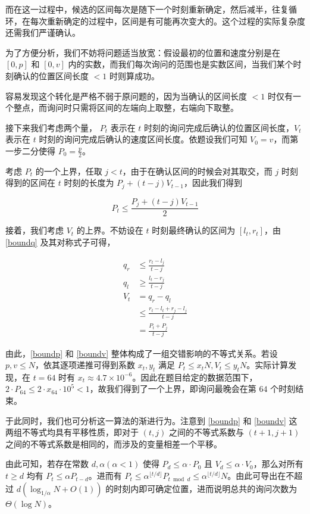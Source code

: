 \documentclass[12pt]{ctexart}
\begin{document}
而在这一过程中，候选的区间每次是随下一个时刻重新确定，然后减半，往复循环，在每次重新确定的过程中，区间是有可能再次变大的。这个过程的实际复杂度还需我们严谨确认。

为了方便分析，我们不妨将问题适当放宽：假设最初的位置和速度分别是在 $[0,p]$ 和 $[0,v]$ 内的实数，而我们每次询问的范围也是实数区间，当我们某个时刻确认的位置区间长度 $<1$ 时则算成功。

容易发现这个转化是严格不弱于原问题的，因为当确认的区间长度 $<1$ 时仅有一个整点，而询问时只需将区间的左端向上取整，右端向下取整。

接下来我们考虑两个量， $P_t$ 表示在 $t$ 时刻的询问完成后确认的位置区间长度，$V_t$ 表示在 $t$ 时刻的询问完成后确认的速度区间长度。依题设我们可知 $V_0=v$，而第一步二分使得 $P_0= \frac p2$。

考虑 $P_t$ 的一个上界，任取 $j<t$，由于在确认区间的时候会对其取交，而 $j$ 时刻得到的区间在 $t$ 时刻的长度为 $P_j+(t-j)V_{t-1}$，因此我们得到

\begin{equation}
P_t \le \frac{P_j + (t-j)V_{t-1}}2 \label{boundp}
\end{equation}

接着，我们考虑 $V_t$ 的上界。不妨设在 $t$ 时刻最终确认的区间为 $[l_t,r_t]$，由 \eqref{boundq} 及其对称式子可得，

\begin{align}
q_r &\le \frac {r_t - l_j}{t-j}\nonumber\\
q_l &\ge \frac {l_t - r_j}{t-j}\nonumber\\
V_t &= q_r-q_l\nonumber\\
 &\le \frac {r_t - l_t + r_j - l_j}{t-j}\nonumber\\
 &= \frac{P_t + P_j}{t-j} \label{boundv}
\end{align}

由此，\eqref{boundp} 和 \eqref{boundv} 整体构成了一组交错影响的不等式关系。若设 $p,v\le N$，依其逐项递推可得到系数 $x_t, y_t$ 满足 $P_t \le x_t N, V_t\le y_t N$。实际计算发现，在 $t=64$ 时有 $x_t \approx 4.7 \times 10^{-6}$。因此在题目给定的数据范围下，$2\cdot P_{64} \leq 2\cdot x_{64} \cdot 10^5 < 1$，故我们得到了一个上界，即询问最晚会在第 $64$ 个时刻结束。

于此同时，我们也可分析这一算法的渐进行为。注意到 \eqref{boundp} 和 \eqref{boundv} 这两组不等式均具有平移性质，即对于 $(t, j)$ 之间的不等式系数与 $(t+1,j+1)$ 之间的不等式系数是相同的，而涉及的变量相差一个平移。

由此可知，若存在常数 $d, \alpha (\alpha < 1)$ 使得 $P_d \le \alpha \cdot P_0$ 且 $V_d \le \alpha \cdot V_0$，那么对所有 $t\ge d$ 均有 $P_t \le \alpha P_{t-d}$。进而有 $P_t \le \alpha^{\lfloor t/d\rfloor} P_{t \bmod d} \le \alpha^{\lfloor t/d\rfloor} N$。由此可导出在不超过 $d(\log_{1/\alpha} N + O(1))$ 的时刻内即可确定位置，进而说明总共的询问次数为 $\Theta(\log N)$。
\end{document}
